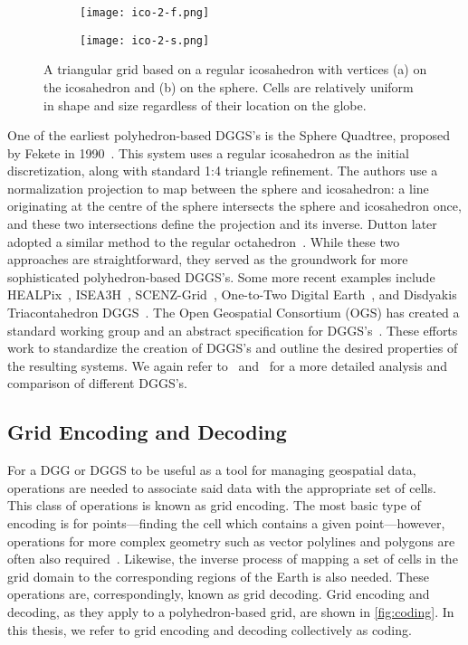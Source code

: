 \begin{figure*}[t!]
	\centering
	\begin{subfigure}[]{0.5\textwidth}
		\centering
		\texttt{[image: ico-2-f.png]}
		\caption{}
	\end{subfigure}%
	\begin{subfigure}[]{0.5\textwidth}
		\centering
		\texttt{[image: ico-2-s.png]}
		\caption{}
	\end{subfigure}

	\caption[An icosahedron-based grid]{
		A triangular grid based on a regular icosahedron with vertices (a) on the icosahedron and (b) on the sphere.
		Cells are relatively uniform in shape and size regardless of their location on the globe.
	}
	\label{fig:poly-grid}
\end{figure*}


One of the earliest polyhedron-based DGGS's is the Sphere Quadtree, proposed by Fekete in 1990~\cite{fekete1990sphere}.
This system uses a regular icosahedron as the initial discretization, along with standard 1:4 triangle refinement.
The authors use a normalization projection to map between the sphere and icosahedron: a line originating at the centre of the sphere intersects the sphere and icosahedron once, and these two intersections define the projection and its inverse.
Dutton later adopted a similar method to the regular octahedron~\cite{dutton1996encoding}.
While these two approaches are straightforward, they served as the groundwork for more sophisticated polyhedron-based DGGS's.
Some more recent examples include HEALPix~\cite{gorski2005healpix}, ISEA3H~\cite{sahr2003geodesic}, SCENZ-Grid~\cite{scenz}, One-to-Two Digital Earth~\cite{mahdavi2013one}, and Disdyakis Triacontahedron DGGS~\cite{hall2020disdyakis}.
The Open Geospatial Consortium (OGS) has created a standard working group and an abstract specification for DGGS's~\cite{ogcDGGS, purss2016ogc}.
These efforts work to standardize the creation of DGGS's and outline the desired properties of the resulting systems.
We again refer to~\cite{mahdavi2015survey} and~\cite{alderson2020digital} for a more detailed analysis and comparison of different DGGS's.


\subsection{Grid Encoding and Decoding} \label{chap:2:coding}
For a DGG or DGGS to be useful as a tool for managing geospatial data, operations are needed to associate said data with the appropriate set of cells.
This class of operations is known as grid encoding.
The most basic type of encoding is for points---finding the cell which contains a given point---however, operations for more complex geometry such as vector polylines and polygons are often also required~\cite{du2018duality}.
Likewise, the inverse process of mapping a set of cells in the grid domain to the corresponding regions of the Earth is also needed.
These operations are, correspondingly, known as grid decoding.
Grid encoding and decoding, as they apply to a polyhedron-based grid, are shown in \cref{fig:coding}.
In this thesis, we refer to grid encoding and decoding collectively as coding.


